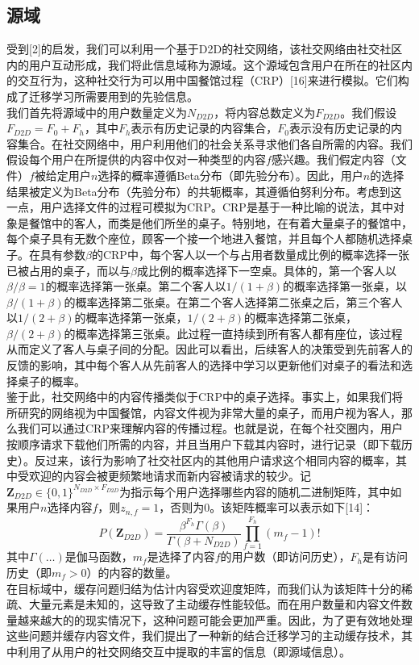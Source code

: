\documentclass[bachelor]{seuthesis} %
\begin{document}
\begin{Main}
\subsection{源域}
受到[2]的启发，我们可以利用一个基于D2D的社交网络，该社交网络由社交社区内的用户互动形成，我们将此信息域称为源域。这个源域包含用户在所在的社区内的交互行为，这种社交行为可以用中国餐馆过程（CRP）[16]来进行模拟。它们构成了迁移学习所需要用到的先验信息。\\
我们首先将源域中的用户数量定义为$N_{D2D}$，将内容总数定义为$F_{D2D}$。我们假设$F_{D2D}=F_0+F_h$，其中$F_h$表示有历史记录的内容集合，$F_0$表示没有历史记录的内容集合。在社交网络中，用户利用他们的社会关系寻求他们各自所需的内容。我们假设每个用户在所提供的内容中仅对一种类型的内容$f$感兴趣。我们假定内容（文件）$f$被给定用户$n$选择的概率遵循Beta分布（即先验分布）。因此，用户$n$的选择结果被定义为Beta分布（先验分布）的共轭概率，其遵循伯努利分布。考虑到这一点，用户选择文件的过程可模拟为CRP。CRP是基于一种比喻的说法，其中对象是餐馆中的客人，而类是他们所坐的桌子。特别地，在有着大量桌子的餐馆中，每个桌子具有无数个座位，顾客一个接一个地进入餐馆，并且每个人都随机选择桌子。在具有参数$\beta$的CRP中，每个客人以一个与占用者数量成比例的概率选择一张已被占用的桌子，而以与$\beta$成比例的概率选择下一空桌。具体的，第一个客人以$\beta/\beta=1$的概率选择第一张桌。第二个客人以$1/(1+\beta)$的概率选择第一张桌，以$\beta/(1+\beta)$的概率选择第二张桌。在第二个客人选择第二张桌之后，第三个客人以$1/(2+\beta)$的概率选择第一张桌，$1/(2+\beta)$的概率选择第二张桌，$\beta/(2+\beta)$的概率选择第三张桌。此过程一直持续到所有客人都有座位，该过程从而定义了客人与桌子间的分配。因此可以看出，后续客人的决策受到先前客人的反馈的影响，其中每个客人从先前客人的选择中学习以更新他们对桌子的看法和选择桌子的概率。\\
鉴于此，社交网络中的内容传播类似于CRP中的桌子选择。事实上，如果我们将所研究的网络视为中国餐馆，内容文件视为非常大量的桌子，而用户视为客人，那么我们可以通过CRP来理解内容的传播过程。也就是说，在每个社交圈内，用户按顺序请求下载他们所需的内容，并且当用户下载其内容时，进行记录（即下载历史）。反过来，该行为影响了社交社区内的其他用户请求这个相同内容的概率，其中受欢迎的内容会被更频繁地请求而新内容被请求的较少。记$\textbf{Z}_{D2D}\in\{0,1\}^{N_{D2D}\times F_{D2D}}$为指示每个用户选择哪些内容的随机二进制矩阵，其中如果用户$n$选择内容$f$，则$z_{n,f}=1$，否则为0。该矩阵概率可以表示如下[14]：
\begin{equation}
P(\textbf{Z}_{D2D})=\frac{\beta^{F_h}\Gamma(\beta)}{\Gamma(\beta+N_{D2D})}\prod_{f=1}^{F_h}(m_f-1)!
\end{equation}
其中$\Gamma(\dots)$是伽马函数，$m_f$是选择了内容$f$的用户数（即访问历史），$F_h$是有访问历史（即$m_f>0$）的内容的数量。\\
在目标域中，缓存问题归结为估计内容受欢迎度矩阵，而我们认为该矩阵十分的稀疏、大量元素是未知的，这导致了主动缓存性能较低。而在用户数量和内容文件数量越来越大的的现实情况下，这种问题可能会更加严重。因此，为了更有效地处理这些问题并缓存内容文件，我们提出了一种新的结合迁移学习的主动缓存技术，其中利用了从用户的社交网络交互中提取的丰富的信息（即源域信息）。

\end{Main}
\end{document}
